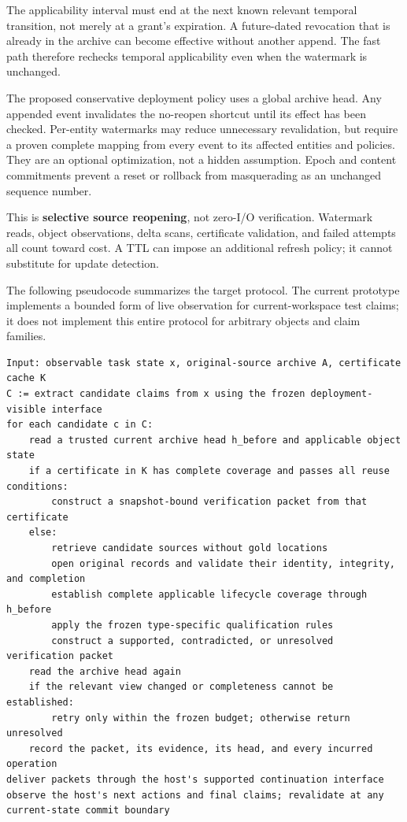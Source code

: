 \documentclass[
  11pt,
  a4paper,
]{article}
\begin{document}
The applicability interval must end at the next known relevant temporal
transition, not merely at a grant's expiration. A future-dated
revocation that is already in the archive can become effective without
another append. The fast path therefore rechecks temporal applicability
even when the watermark is unchanged.

The proposed conservative deployment policy uses a global archive head.
Any appended event invalidates the no-reopen shortcut until its effect
has been checked. Per-entity watermarks may reduce unnecessary
revalidation, but require a proven complete mapping from every event to
its affected entities and policies. They are an optional optimization,
not a hidden assumption. Epoch and content commitments prevent a reset
or rollback from masquerading as an unchanged sequence number.

This is \textbf{selective source reopening}, not zero-I/O verification.
Watermark reads, object observations, delta scans, certificate
validation, and failed attempts all count toward cost. A TTL can impose
an additional refresh policy; it cannot substitute for update detection.

The following pseudocode summarizes the target protocol. The current
prototype implements a bounded form of live observation for
current-workspace test claims; it does not implement this entire
protocol for arbitrary objects and claim families.

\begin{verbatim}
Input: observable task state x, original-source archive A, certificate cache K
C := extract candidate claims from x using the frozen deployment-visible interface
for each candidate c in C:
    read a trusted current archive head h_before and applicable object state
    if a certificate in K has complete coverage and passes all reuse conditions:
        construct a snapshot-bound verification packet from that certificate
    else:
        retrieve candidate sources without gold locations
        open original records and validate their identity, integrity, and completion
        establish complete applicable lifecycle coverage through h_before
        apply the frozen type-specific qualification rules
        construct a supported, contradicted, or unresolved verification packet
    read the archive head again
    if the relevant view changed or completeness cannot be established:
        retry only within the frozen budget; otherwise return unresolved
    record the packet, its evidence, its head, and every incurred operation
deliver packets through the host's supported continuation interface
observe the host's next actions and final claims; revalidate at any current-state commit boundary
\end{verbatim}
\end{document}
